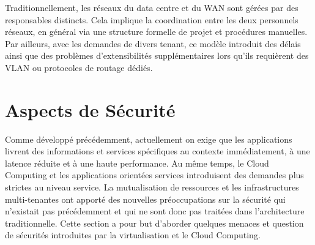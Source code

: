 Traditionnellement,  les réseaux du data centre et du WAN sont gérées  par des responsables distincts. Cela implique la coordination entre les deux personnels réseaux, en général via une structure formelle de projet et procédures manuelles. Par ailleurs, avec les demandes de divers tenant, ce modèle introduit des délais ainsi que des problèmes d'extensibilités supplémentaires lors qu'ils requièrent des VLAN ou protocoles de routage dédiés.









\section{Aspects de Sécurité}

Comme développé précédemment, actuellement on exige que les applications livrent des informations et services spécifiques au contexte immédiatement, à une latence réduite et à une haute performance. Au même temps, le Cloud Computing et les applications orientées services introduisent des demandes plus strictes au niveau service. La mutualisation de ressources et les infrastructures multi-tenantes ont apporté des nouvelles préoccupations sur la sécurité qui n'existait pas précédemment et qui ne sont donc pas traitées dans l'architecture traditionnelle. Cette section a pour but d'aborder quelques menaces et question de sécurités introduites par la virtualisation et le Cloud Computing.







